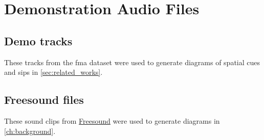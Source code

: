 \chapter{Demonstration Audio Files}
\label{app:demo_tracks}

\section*{Demo tracks}

These tracks from the \gls{fma} dataset \cite{defferrardFMADatasetMusic2017} were used to generate diagrams of spatial cues and \glspl{sip} in \cref{sec:related_works}.

\bigskip 

{
    \footnotesize
    
}


\section*{Freesound files}

These sound clips from \href{https://freesound.org}{Freesound} \cite{Freesound} were used to generate diagrams in \cref{ch:background}.

\bigskip 

{
    \footnotesize
    
}


